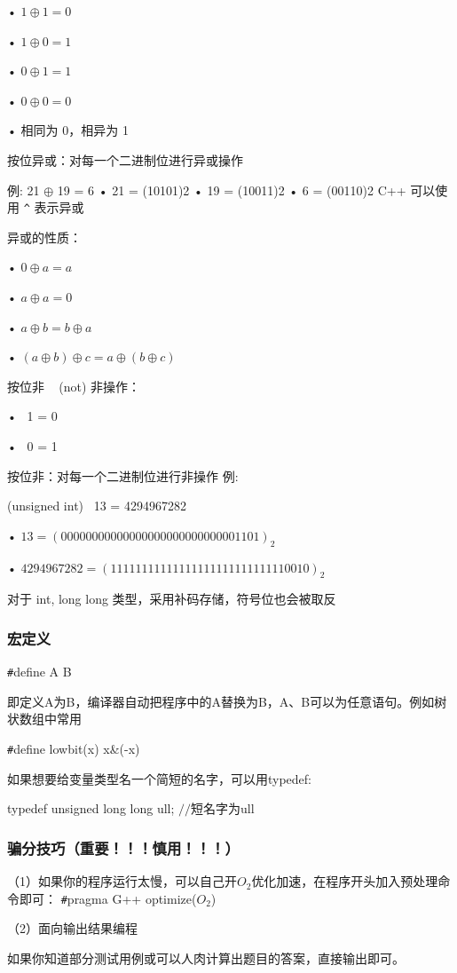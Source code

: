 \documentclass[UTF8]{ctexart}
\begin{document}
•  $1 \oplus 1 = 0$

•  $1 \oplus 0 = 1$

•  $0 \oplus 1 = 1$

•  $0 \oplus 0 = 0$

• 相同为 0，相异为 1 

按位异或：对每一个二进制位进行异或操作 

例: 21 $\oplus$ 19 = 6 • 21 = (10101)2 • 19 = (10011)2 • 6 = (00110)2 		C++ 可以使用 \verb|^| 表示异或

异或的性质： 

• $0 \oplus a = a$ 

• $a \oplus a = 0$

• $a \oplus b = b \oplus a$

• $(a \oplus b) \oplus c = a \oplus (b \oplus c)$

按位非 ~ (not) 非操作： 

• ~1 = 0 

• ~0 = 1 

按位非：对每一个二进制位进行非操作 例: 

(unsigned int) ~13 = 4294967282 

• $13 = (00000000000000000000000000001101)_2$

• $4294967282 = (11111111111111111111111111110010)_2$

对于 int, long long 类型，采用补码存储，符号位也会被取反

\subsubsection{宏定义}
\verb|#|define A B

即定义A为B，编译器自动把程序中的A替换为B，A、B可以为任意语句。例如树状数组中常用

\verb|#|define lowbit(x) x\&(-x)

如果想要给变量类型名一个简短的名字，可以用typedef:

typedef unsigned long long ull; $//$短名字为ull

\subsubsection{骗分技巧（重要！！！慎用！！！）}
（1）如果你的程序运行太慢，可以自己开$O_2$优化加速，在程序开头加入预处理命令即可：
\verb|#|pragma G++ optimize($O_2$)

（2）面向输出结果编程

如果你知道部分测试用例或可以人肉计算出题目的答案，直接输出即可。
\end{document}

